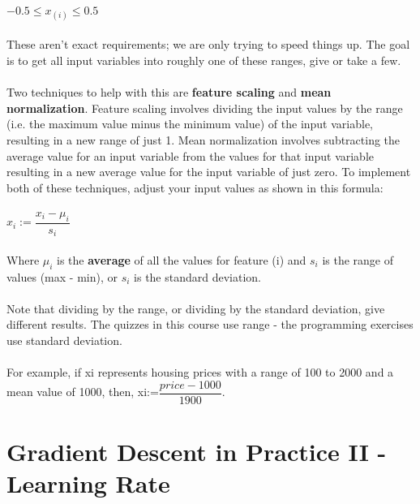 \documentclass{article}
\begin{document}
\begin{CJK}{UTF8}{gbsn}
\paragraph{}
$-0.5\leq x_{(i)}\leq0.5$
\paragraph{}
These aren't exact requirements; we are only trying to speed things up. The goal is to get all input variables into roughly one of these ranges, give or take a few.
\paragraph{}
Two techniques to help with this are \textbf{feature scaling} and \textbf{mean normalization}. Feature scaling involves dividing the input values by the range (i.e. the maximum value minus the minimum value) of the input variable, resulting in a new range of just 1. Mean normalization involves subtracting the average value for an input variable from the values for that input variable resulting in a new average value for the input variable of just zero. To implement both of these techniques, adjust your input values as shown in this formula:
\paragraph{}
$x_{i}:=\dfrac{x_{i}-\mu_{i}}{s_{i}}$
\paragraph{}
Where $\mu_{i}$ is the \textbf{average} of all the values for feature (i) and $s_{i}$ is the range of values (max - min), or $s_{i}$ is the standard deviation.
\paragraph{}
Note that dividing by the range, or dividing by the standard deviation, give different results. The quizzes in this course use range - the programming exercises use standard deviation.
\paragraph{}
For example, if xi represents housing prices with a range of 100 to 2000 and a mean value of 1000, then, xi:=$\dfrac{price-1000}{1900}$.
\section{Gradient Descent in Practice II - Learning Rate}

\end{CJK}
\end{document}
